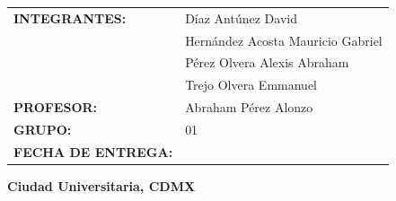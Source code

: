 \begin{center}
	{\color{black}\fontsize{13}{15}\selectfont
		\renewcommand{\arraystretch}{1.5} %
		\begin{tabular}{l l}
			\textbf{INTEGRANTES:}    & Díaz Antúnez David \\
			                         & Hernández Acosta Mauricio Gabriel \\
			                         & Pérez Olvera Alexis Abraham \\
			                         & Trejo Olvera Emmanuel \\
			\textbf{PROFESOR:}       & Abraham Pérez Alonzo \\
			\textbf{GRUPO:}          & 01 \\
			\textbf{FECHA DE ENTREGA:} & \fechaEntrega
		\end{tabular}
	}
	
	\vfill
	
	{\color{black}\fontsize{11}{13}\selectfont
		\textbf{Ciudad Universitaria, CDMX} \hfill \textbf{\fechaEntrega}
	}
\end{center}

\newpage